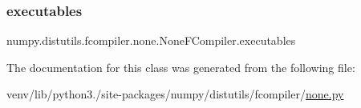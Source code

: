 \subsubsection{\texorpdfstring{executables}{executables}}
{\footnotesize\ttfamily numpy.\+distutils.\+fcompiler.\+none.\+None\+F\+Compiler.\+executables\hspace{0.3cm}{\ttfamily [static]}}



The documentation for this class was generated from the following file\+:\begin{DoxyCompactItemize}
\item 
venv/lib/python3./site-\/packages/numpy/distutils/fcompiler/\hyperlink{none_8py}{none.\+py}\end{DoxyCompactItemize}
